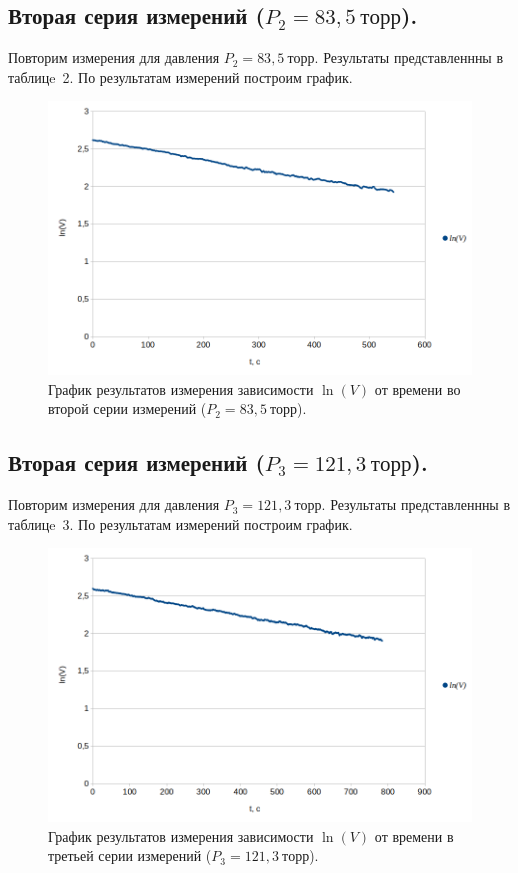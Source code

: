 \documentclass[a4paper,11pt]{article}
\begin{document}
\subsection{Вторая серия измерений ($P_{2} = 83,5\ торр$).}
Повторим измерения для давления $P_{2} = 83,5\ торр$. Результаты представленнны в таблицe~2.
По результатам измерений построим график.
\begin{figure}[h!]\label{fig:img4}
  \centering
  \includegraphics[scale = 0.4125]{graph2.png}
  \caption{График результатов измерения зависимости $\ln(V)$ от времени во второй серии измерений ($P_{2} = 83,5\ торр$).}
\end{figure}
\subsection{Вторая серия измерений ($P_{3} = 121,3\ торр$).}
Повторим измерения для давления $P_{3} = 121,3\ торр$. Результаты представленнны в таблицe~3.
По результатам измерений построим график.
\begin{figure}[h!]\label{fig:img4}
  \centering
  \includegraphics[scale = 0.4125]{graph3.png}
  \caption{График результатов измерения зависимости $\ln(V)$ от времени в третьей серии измерений ($P_{3} = 121,3\ торр$).}
\end{figure}
\end{document}
